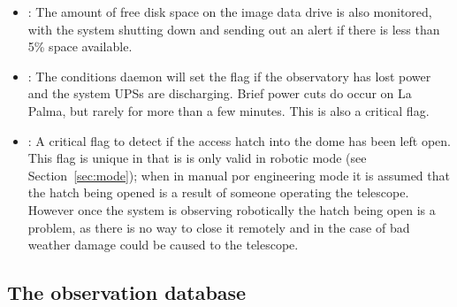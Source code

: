 \begin{colsection}
\begin{colsection}
\begin{itemize}
\item {}: The amount of free disk space on the image data drive is also monitored, with the system shutting down and sending out an alert if there is less than 5\% space available.

\item {}: The conditions daemon will set the  flag if the observatory has lost power and the system UPSs are discharging. Brief power cuts do occur on La Palma, but rarely for more than a few minutes. This is also a critical flag.

\item {}: A critical flag to detect if the access hatch into the dome has been left open. This flag is unique in that is is only valid in robotic mode (see Section~\ref{sec:mode}); when in manual por engineering mode it is assumed that the hatch being opened is a result of someone operating the telescope. However once the system is observing robotically the hatch being open is a problem, as there is no way to close it remotely and in the case of bad weather damage could be caused to the telescope.

\end{itemize}

\end{colsection}


\subsection{The observation database}
\label{sec:obsdb}
\begin{colsection}


\end{colsection}
\end{colsection}
